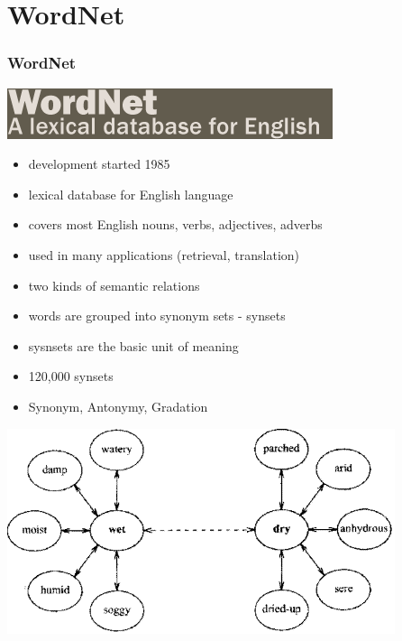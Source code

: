 \section{WordNet}
\begin{frame}
\frametitle{WordNet}
\includegraphics[scale=0.35]{img/wordnet_logo.png}
\begin{itemize}
\item development started 1985
\item lexical database for English language
\item covers most English nouns, verbs, adjectives, adverbs
\item used in many applications (retrieval, translation)
\item two kinds of semantic relations
\end{itemize}
\end{frame}

\begin{frame}
\begin{itemize}
\frametitle{Synsets - Lexical (word-word) relation}
\item words are grouped into synonym sets - synsets
\item sysnsets are the basic unit of meaning
\item 120,000 synsets
\item Synonym, Antonymy, Gradation
\end{itemize}
\includegraphics[scale=0.55]{img/wordnet-syn.png}
\end{frame}

